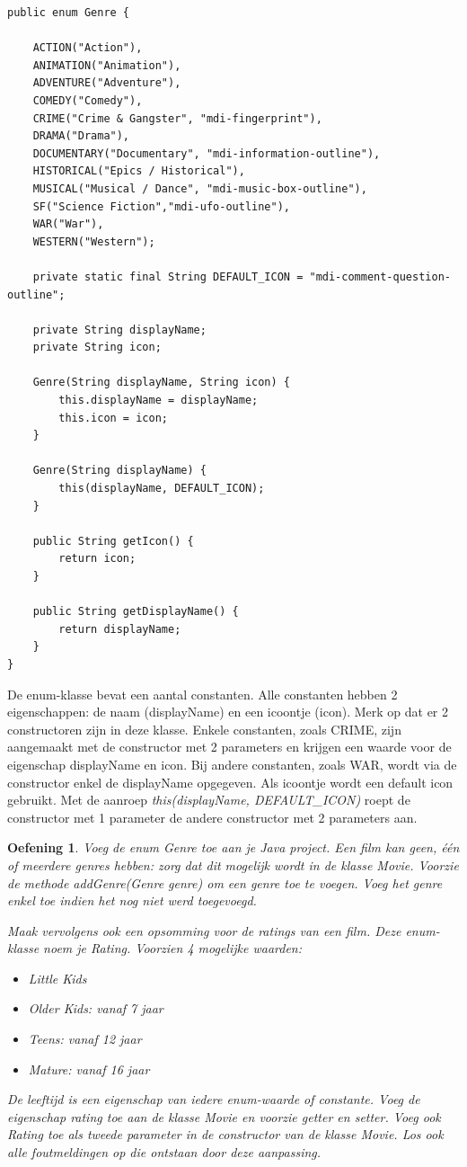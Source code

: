 \documentclass{tstextbook}
\newtheorem{envoefening}{Oefening}[chapter]
\newenvironment{oefening}
               {\begin{boxexercise}\begin{envoefening}}
               {\end{envoefening}\end{boxexercise}}
\begin{document}
\begin{lstlisting}
public enum Genre {

	ACTION("Action"),
	ANIMATION("Animation"),
	ADVENTURE("Adventure"),
	COMEDY("Comedy"),
	CRIME("Crime & Gangster", "mdi-fingerprint"),
	DRAMA("Drama"),
	DOCUMENTARY("Documentary", "mdi-information-outline"),
	HISTORICAL("Epics / Historical"),
	MUSICAL("Musical / Dance", "mdi-music-box-outline"),
	SF("Science Fiction","mdi-ufo-outline"),
	WAR("War"),
	WESTERN("Western");

	private static final String DEFAULT_ICON = "mdi-comment-question-outline";

	private String displayName;
	private String icon;

	Genre(String displayName, String icon) {
		this.displayName = displayName;
		this.icon = icon;
	}

	Genre(String displayName) {
		this(displayName, DEFAULT_ICON);
	}

	public String getIcon() {
		return icon;
	}

	public String getDisplayName() {
		return displayName;
	}
}
\end{lstlisting}

De enum-klasse bevat een aantal constanten. Alle constanten hebben 2 eigenschappen: de naam (displayName) en een icoontje (icon). Merk op dat er 2 constructoren zijn in deze klasse. Enkele constanten, zoals CRIME, zijn aangemaakt met de constructor met 2 parameters en krijgen een waarde voor de eigenschap displayName en icon. Bij andere constanten, zoals WAR, wordt via de constructor enkel de displayName opgegeven. Als icoontje wordt een default icon gebruikt. Met de aanroep \emph{this(displayName, DEFAULT\_ICON)} roept de constructor met 1 parameter de andere constructor met 2 parameters aan.

\begin{oefening}
Voeg de enum Genre toe aan je Java project.  Een film kan geen, \'{e}\'{e}n of meerdere genres hebben: zorg dat dit mogelijk wordt in de klasse Movie.  Voorzie de methode \emph{addGenre(Genre genre)} om een genre toe te voegen. Voeg het genre enkel toe indien het nog niet werd toegevoegd.

Maak vervolgens ook een opsomming voor de ratings van een film. Deze enum-klasse noem je Rating. Voorzien 4 mogelijke waarden:
\begin{itemize}
\item Little Kids
\item Older Kids: vanaf 7 jaar
\item Teens: vanaf 12 jaar
\item Mature: vanaf 16 jaar
\end{itemize}
De leeftijd is een eigenschap van iedere enum-waarde of constante.
Voeg de eigenschap rating toe aan de klasse Movie en voorzie getter en setter.
Voeg ook Rating toe als tweede parameter in de constructor van de klasse Movie. Los ook alle foutmeldingen op die ontstaan door deze aanpassing.
\end{oefening}
\end{document}
